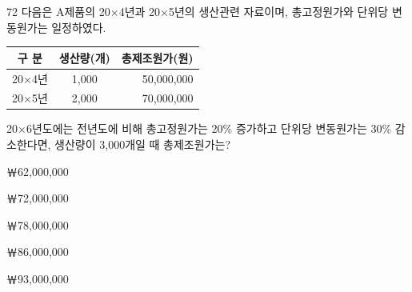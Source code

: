 \begin{question}{72}
다음은 A제품의 20×4년과 20×5년의 생산관련 자료이며, 총고정원가와 단위당 변동원가는 일정하였다.

{\small\centering
\begin{tabular}{|c|c|r|}\hline
구 분 & 생산량(개) & \multicolumn{1}{c|}{총제조원가(원)} \\ \hline
20×4년 & 1,000 & 50,000,000 \\ \hline
20×5년 & 2,000 & 70,000,000 \\ \hline
\end{tabular}\par}

20×6년도에는 전년도에 비해 총고정원가는 20\% 증가하고 단위당 변동원가는 30\% 감소한다면, 생산량이 3,000개일 때 총제조원가는?
\begin{choices}
  \item ￦62,000,000
  \item ￦72,000,000
  \item ￦78,000,000
  \item ￦86,000,000
  \item ￦93,000,000
\end{choices}
\end{question}
